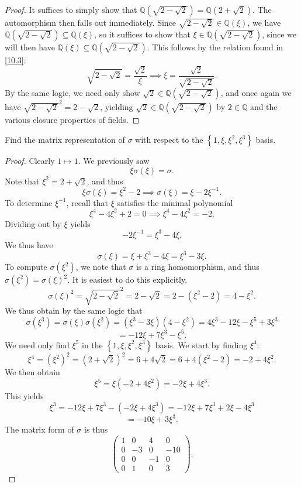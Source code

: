 \documentclass[11pt, letterpaper]{article}
\begin{document}
\begin{proof}
	It suffices to simply show that $\mathbb{Q} (\sqrt{2-\sqrt{2} } )=\mathbb{Q} (2+\sqrt{2} )$. The automorphism then falls out immediately. Since $\sqrt{2-\sqrt{2} } \in\mathbb{Q} (\xi )$, we have $\mathbb{Q} (\sqrt{2-\sqrt{2} } )\subseteq \mathbb{Q} (\xi )$, so it suffices to show that $\xi \in \mathbb{Q} (\sqrt{2-\sqrt{2} } )$, since we will then have $\mathbb{Q} (\xi )\subseteq \mathbb{Q} (\sqrt{2-\sqrt{2} } )$. This follows by the relation found in \cref{10.3}:
	\[
		\sqrt{2-\sqrt{2} } =\frac{\sqrt{2} }{\xi } \implies \xi =\frac{\sqrt{2} }{\sqrt{2-\sqrt{2} } } 
	.\]
	By the same logic, we need only show $\sqrt{2} \in\mathbb{Q}(\sqrt{2-\sqrt{2} } )$, and once again we have $\sqrt{2-\sqrt{2} } ^2=2-\sqrt{2} $, yielding $\sqrt{2} \in\mathbb{Q} (\sqrt{2-\sqrt{2} } )$ by $2\in\mathbb{Q} $ and the various closure properties of fields.
\end{proof}
\begin{problem}
	Find the matrix representation of $\sigma $ with respect to the $\left\{ 1,\xi ,\xi ^2,\xi ^3 \right\} $ basis.
\end{problem}
\begin{proof}
	Clearly $1\mapsto 1$. We previously saw
	\[
		\xi \sigma (\xi )=\sigma 
	.\]
	Note that $\xi ^2=2+\sqrt{2} $, and thus
	\[
		\xi \sigma (\xi )=\xi ^2-2 \implies \sigma (\xi )=\xi -2\xi ^{-1} 
	.\]
	To determine $\xi ^{-1} $, recall that $\xi $ satisfies the minimal polynomial
	\[
		\xi ^4-4\xi ^2+2=0 \implies \xi ^4 - 4\xi ^2=-2
	.\]
	Dividing out by $\xi $ yields
	\[
		-2\xi ^{-1} =\xi ^3-4\xi
	.\]
	We thus have
	\[
		\sigma (\xi )=\xi +\xi ^3-4\xi =\xi ^3-3\xi 
	.\]
	To compute $\sigma (\xi ^2)$, we note that $\sigma $ is a ring homomorphism, and thus $\sigma (\xi ^2)=\sigma (\xi )^2$. It is easiest to do this explicitly.
	\[
		\sigma (\xi )^2=\sqrt{2-\sqrt{2} } ^2=2-\sqrt{2} =2-\left( \xi^2-2 \right) =4-\xi ^2
	.\]
	We thus obtain by the same logic that
	\[
		\sigma (\xi ^3)=\sigma (\xi )\sigma (\xi ^2)=\left( \xi ^3-3\xi  \right) \left( 4-\xi ^2 \right) =4\xi ^3-12\xi -\xi ^5+3\xi ^3
	\]
	\[
		=-12\xi +7\xi ^3-\xi ^5
	.\]
	We need only find $\xi ^5$ in the $\left\{ 1,\xi ,\xi ^2,\xi ^3 \right\} $ basis. We start by finding $\xi ^4$:
	\[
		\xi ^4=\left( \xi ^2 \right) ^2=\left( 2+\sqrt{2}  \right) ^2=6+4\sqrt{2} =6+4\left( \xi ^2-2 \right) =-2+4\xi ^2
	.\]
	We then obtain
	\[
		\xi ^5=\xi \left( -2+4\xi ^2 \right) =-2\xi +4\xi ^3
	.\]
	This yields
	\[
		\xi ^3 = -12\xi +7\xi ^3-\left( -2\xi +4\xi ^3 \right) =-12\xi +7\xi ^3+2\xi -4\xi ^3
	\]
	\[
		=-10\xi +3\xi ^3
	.\]
	The matrix form of $\sigma $ is thus
	\[
		\begin{pmatrix}
		1 & 0 & 4 & 0 \\
		0 & -3 & 0 & -10 \\
		0 & 0 & -1 & 0 \\
		0 & 1 & 0 & 3
		\end{pmatrix}
	.\]
\end{proof}
\end{document}
